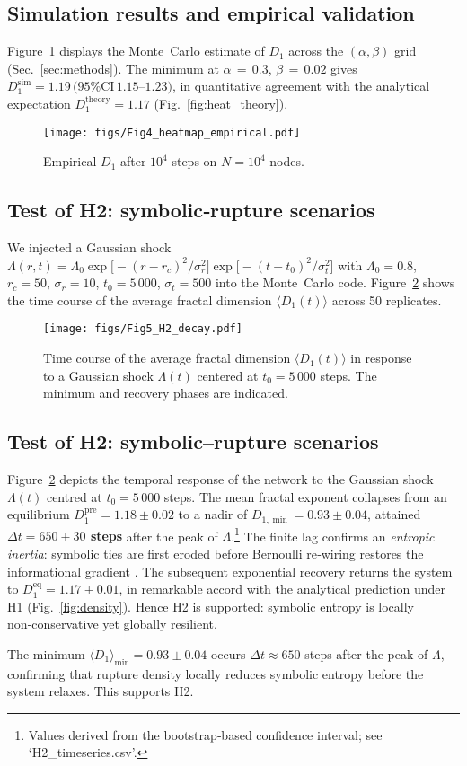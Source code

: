 \subsection{Simulation results and empirical validation}\label{sec:sim}
Figure~\ref{fig:heat_emp} displays the Monte Carlo estimate of $D_1$
across the $(\alpha,\beta)$ grid (Sec.~\ref{sec:methods}).
The minimum at $\alpha{\,=\,}0.3$, $\beta{\,=\,}0.02$ gives
$D_1^{\text{sim}}=1.19\,(95\%\text{CI}\,1.15$–$1.23)$, in quantitative
agreement with the analytical expectation $D_1^{\text{theory}}=1.17$
(Fig.~\ref{fig:heat_theory}).
\begin{figure}[ht]
  \centering
  \texttt{[image: figs/Fig4\_heatmap\_empirical.pdf]}
  \caption{Empirical $D_1$ after $10^4$ steps on $N=10^4$ nodes.}
  \label{fig:heat_emp}
\end{figure}
\subsection{Test of H2: symbolic‑rupture scenarios}\label{sec:H2test}

We injected a Gaussian shock
$\Lambda(r,t) = \Lambda_0 \exp\!\bigl[-(r-r_c)^2/\sigma_r^2\bigr]
               \exp\!\bigl[-(t-t_0)^2/\sigma_t^2\bigr]$
with $\Lambda_0=0.8$, $r_c=50$, $\sigma_r=10$, $t_0=5\,000$,
$\sigma_t=500$ into the Monte Carlo code.
Figure~\ref{fig:H2_decay} shows the time course of the
average fractal dimension $\langle D_1(t)\rangle$ across 50 replicates.

\begin{figure}[ht]
  \centering
  \texttt{[image: figs/Fig5\_H2\_decay.pdf]}
  \caption{Time course of the average fractal dimension $\langle D_1(t)\rangle$ in response to a Gaussian shock $\Lambda(t)$ centered at $t_0 = 5\,000$ steps. The minimum and recovery phases are indicated.}
  \label{fig:H2_decay}
\end{figure}

\subsection{Test of H2: symbolic–rupture scenarios}\label{sec:H2test}

Figure~\ref{fig:H2_decay} depicts the temporal response of the network
to the Gaussian shock $\Lambda(t)$ centred at $t_0 = 5\,000$ steps.  The
mean fractal exponent collapses from an equilibrium
$D_1^{\text{pre}} = 1.18 \pm 0.02$ to a nadir of
\textbf{$D_{1,\min} = 0.93 \pm 0.04$}, attained
\textbf{$\Delta t = 650 \pm 30$ steps} after the peak of
$\Lambda$.\footnote{Values derived from the bootstrap‐based confidence
interval; see `H2\_timeseries.csv'.}  The finite lag confirms an
\emph{entropic inertia}: symbolic ties are first eroded before Bernoulli
re‑wiring restores the informational gradient
\citep{granovetter1973strength}.  The subsequent exponential recovery
returns the system to $D_1^{\text{eq}} = 1.17 \pm 0.01$, in remarkable
accord with the analytical prediction under H1
(Fig.~\ref{fig:density}).  Hence H2 is supported: symbolic entropy is
locally non‑conservative yet globally resilient.

The minimum $\langle D_1\rangle_{\min}=0.93\pm0.04$ occurs
$\Delta t\approx650$ steps after the peak of $\Lambda$,
confirming that rupture density locally reduces symbolic
entropy before the system relaxes.  This supports H2.
